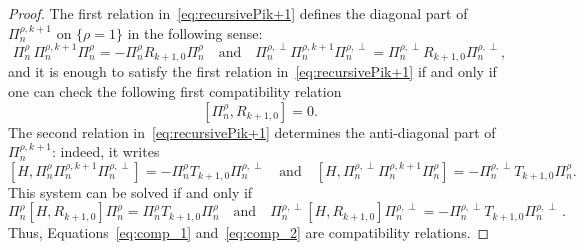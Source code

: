 \documentclass[12pt,a4paper]{amsart}
\theoremstyle{plain}
\theoremstyle{definition}
\theoremstyle{remark}
\numberwithin{equation}{section}
\theoremstyle{definition}
\numberwithin{equation}{section}
\begin{document}
\begin{proof}
    The first relation in~\eqref{eq:recursivePik+1} defines the diagonal part of $\Pi_n^{\rho,k+1}$ on $\{\rho=1\}$ in the following sense:
    \begin{equation}
        \label{eq:Pi_k+1_diag}
        \Pi_n^{\rho}\,\Pi_n^{\rho,k+1}\Pi_n^{\rho} = -\Pi_n^{\rho}R_{k+1,0}\Pi_n^{\rho}\quad\mbox{and}\quad \Pi_n^{\rho,\perp}\Pi_n^{\rho,k+1}\Pi_n^{\rho,\perp} = \Pi_n^{\rho,\perp}R_{k+1,0}\Pi_n^{\rho,\perp},
    \end{equation}
    and it is enough to satisfy the first relation in~\eqref{eq:recursivePik+1} if and only if one can check the following first compatibility relation 
    \begin{equation}\label{eq:comp_1}
        [\Pi_n^{\rho},R_{k+1,0}]=0.
    \end{equation}
    The second relation in~\eqref{eq:recursivePik+1} determines the anti-diagonal part of $\Pi_n^{\rho,k+1}$: indeed, it writes 
    \begin{equation}\label{eq:rec_k}
        [H,\Pi_n^{\rho} \Pi_n^{\rho,k+1}\Pi_n^{\rho,\perp}]=-\Pi_n^{\rho} 
        T_{k+1,0}\Pi_n^{\rho,\perp}\quad\mbox{and}\quad [H,\Pi_n^{\rho,\perp} \Pi_n^{\rho,k+1}\Pi_n^{\rho}]=-\Pi_n^{\rho,\perp} T_{k+1,0}\Pi_n^{\rho}.
    \end{equation}
    This system can be solved if and only if 
    \begin{equation}\label{eq:comp_2}
        \Pi_n^{\rho}[H,R_{k+1,0}]\Pi_n^{\rho}=\Pi_n^{\rho} T_{k+1,0}\Pi_n^{\rho}\quad\mbox{and}\quad
	   \Pi_n^{\rho,\perp}[H,R_{k+1,0}]\Pi_n^{\rho,\perp}=-\Pi_n^{\rho,\perp} T_{k+1,0}\Pi_n^{\rho,\perp}\,.
	\end{equation}
    Thus, Equations~\eqref{eq:comp_1} and~\eqref{eq:comp_2} are compatibility relations. 


\end{proof}
\end{document}
